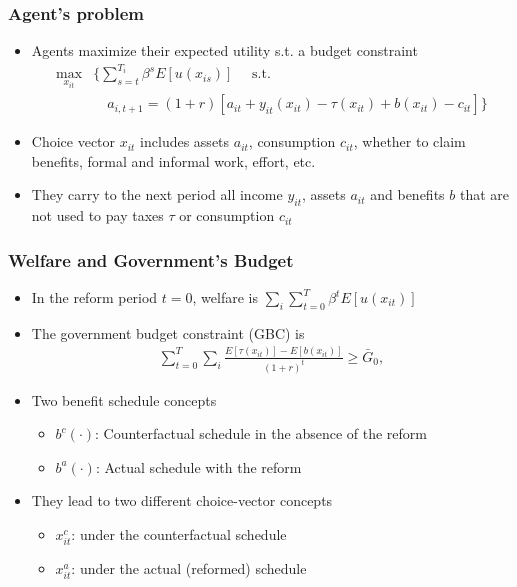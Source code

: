 
\begin{frame}[label=model]
\frametitle{Agent's problem}
\begin{itemize}
    \item Agents maximize their expected utility s.t. a budget constraint
    \begin{align*}
        \max_{x_{it}} &\Bigg\{\sum_{s=t}^{T_i}\beta^s E[ u(x_{is})]\quad \text{ s.t. } \\
         &\quad a_{i,t+1} =(1+r)[a_{it}+y_{it}(x_{it})-\tau(x_{it})+b(x_{it})-c_{it}]\Bigg\}
    \end{align*}
    \item Choice vector $x_{it}$ includes assets $a_{it}$, consumption $c_{it}$, whether to claim benefits, formal and informal work, effort, etc.
    \item They carry to the next period all income $y_{it}$, assets $a_{it}$ and benefits $b$ that are not used to pay taxes $\tau$ or consumption $c_{it}$
\end{itemize}
\end{frame}

\begin{frame}
\frametitle{Welfare and Government's Budget}
\begin{itemize}
    \item In the reform period $t=0$, welfare is $\sum_{i} \sum_{t=0}^T\beta^t E[ u(x_{it})]$
    \item The government budget constraint (GBC) is
    \begin{align*}
        \sum_{t=0}^T \sum_i \frac{E[\tau(x_{it})]-E[b(x_{it})]}{(1+r)^t}\geq\bar G_0,
    \end{align*}
    \item Two benefit schedule concepts
    \begin{itemize}
        \item $b^c(\cdot)$: Counterfactual schedule in the absence of the reform
        \item $b^a(\cdot)$: Actual schedule with the reform
    \end{itemize}
    \item They lead to two different choice-vector concepts
    \begin{itemize}
        \item $x^c_{it}$: under the counterfactual schedule
        \item $x_{it}^a$: under the actual (reformed) schedule
    \end{itemize}
\end{itemize}
\end{frame}


